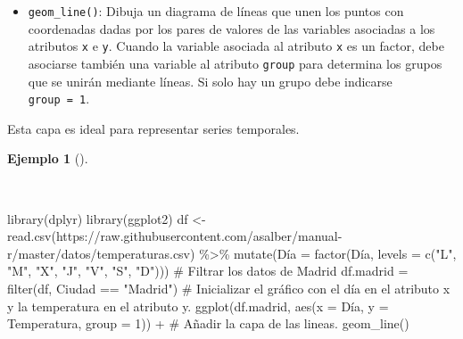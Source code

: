 \documentclass[
  a4paper,
]{scrreport}
\newenvironment{Shaded}{\begin{snugshade}}{\end{snugshade}}
\newcommand{\AttributeTok}[1]{\textcolor[rgb]{0.40,0.45,0.13}{#1}}
\newcommand{\CommentTok}[1]{\textcolor[rgb]{0.37,0.37,0.37}{#1}}
\newcommand{\DecValTok}[1]{\textcolor[rgb]{0.68,0.00,0.00}{#1}}
\newcommand{\FunctionTok}[1]{\textcolor[rgb]{0.28,0.35,0.67}{#1}}
\newcommand{\NormalTok}[1]{\textcolor[rgb]{0.00,0.23,0.31}{#1}}
\newcommand{\OtherTok}[1]{\textcolor[rgb]{0.00,0.23,0.31}{#1}}
\newcommand{\SpecialCharTok}[1]{\textcolor[rgb]{0.37,0.37,0.37}{#1}}
\newcommand{\StringTok}[1]{\textcolor[rgb]{0.13,0.47,0.30}{#1}}
\providecommand{\tightlist}{%
  \setlength{\itemsep}{0pt}\setlength{\parskip}{0pt}}\usepackage{longtable,booktabs,array}
\theoremstyle{definition}
\theoremstyle{definition}
\newtheorem{example}{Ejemplo}[chapter]
\theoremstyle{remark}
\begin{document}
\begin{itemize}
\tightlist
\item
  \texttt{geom\_line()}: Dibuja un diagrama de líneas que unen los
  puntos con coordenadas dadas por los pares de valores de las variables
  asociadas a los atributos \texttt{x} e \texttt{y}. Cuando la variable
  asociada al atributo \texttt{x} es un factor, debe asociarse también
  una variable al atributo \texttt{group} para determina los grupos que
  se unirán mediante líneas. Si solo hay un grupo debe indicarse
  \texttt{group\ =\ 1}.
\end{itemize}

Esta capa es ideal para representar series temporales.

\begin{example}[]\protect\hypertarget{exm-lineas-1}{}\label{exm-lineas-1}

~

\begin{Shaded}
\begin{Highlighting}[]
\FunctionTok{library}\NormalTok{(dplyr)}
\FunctionTok{library}\NormalTok{(ggplot2)}
\NormalTok{df }\OtherTok{\textless{}{-}} \FunctionTok{read.csv}\NormalTok{(}\StringTok{\textquotesingle{}https://raw.githubusercontent.com/asalber/manual{-}r/master/datos/temperaturas.csv\textquotesingle{}}\NormalTok{) }\SpecialCharTok{\%\textgreater{}\%}
    \FunctionTok{mutate}\NormalTok{(Día }\OtherTok{=} \FunctionTok{factor}\NormalTok{(Día, }\AttributeTok{levels =} \FunctionTok{c}\NormalTok{(}\StringTok{"L"}\NormalTok{, }\StringTok{"M"}\NormalTok{, }\StringTok{"X"}\NormalTok{, }\StringTok{"J"}\NormalTok{, }\StringTok{"V"}\NormalTok{, }\StringTok{"S"}\NormalTok{, }\StringTok{"D"}\NormalTok{)))}
\CommentTok{\# Filtrar los datos de Madrid}
\NormalTok{df.madrid }\OtherTok{=} \FunctionTok{filter}\NormalTok{(df, Ciudad }\SpecialCharTok{==} \StringTok{"Madrid"}\NormalTok{)}
\CommentTok{\# Inicializar el gráfico con el día en el atributo x y la temperatura en el atributo y. }
\FunctionTok{ggplot}\NormalTok{(df.madrid, }\FunctionTok{aes}\NormalTok{(}\AttributeTok{x =}\NormalTok{ Día, }\AttributeTok{y =}\NormalTok{ Temperatura, }\AttributeTok{group =} \DecValTok{1}\NormalTok{)) }\SpecialCharTok{+}
\CommentTok{\# Añadir la capa de las lineas.}
    \FunctionTok{geom\_line}\NormalTok{()}
\end{Highlighting}
\end{Shaded}


\end{example}
\end{document}
